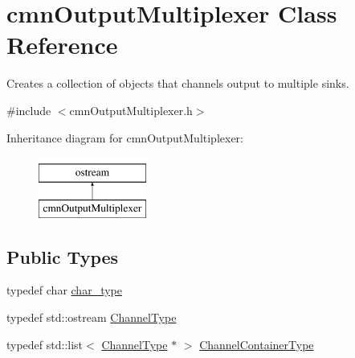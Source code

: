 \hypertarget{classcmn_output_multiplexer}{}\section{cmn\+Output\+Multiplexer Class Reference}
\label{classcmn_output_multiplexer}


Creates a collection of objects that channels output to multiple sinks.  




{\ttfamily \#include $<$cmn\+Output\+Multiplexer.\+h$>$}

Inheritance diagram for cmn\+Output\+Multiplexer\+:\begin{figure}[H]
\begin{center}
\leavevmode
\includegraphics[height=2.000000cm]{d5/d01/classcmn_output_multiplexer}
\end{center}
\end{figure}
\subsection*{Public Types}
\begin{DoxyCompactItemize}
\item 
typedef char \hyperlink{classcmn_output_multiplexer_aa35542dd7f4e6d55780bc7ed741910fe}{char\+\_\+type}
\item 
typedef std\+::ostream \hyperlink{classcmn_output_multiplexer_abebdbc4cebf9eeb2ce4159f2c649968e}{Channel\+Type}
\item 
typedef std\+::list$<$ \hyperlink{classcmn_output_multiplexer_abebdbc4cebf9eeb2ce4159f2c649968e}{Channel\+Type} $\ast$ $>$ \hyperlink{classcmn_output_multiplexer_aca2d6dc567cf721a0dbb2f887c175b7b}{Channel\+Container\+Type}
\end{DoxyCompactItemize}
